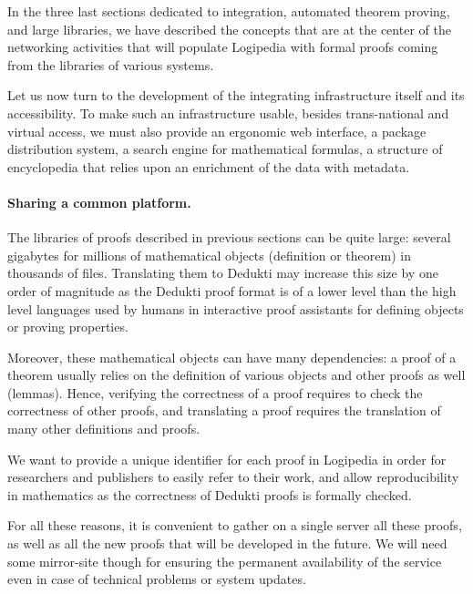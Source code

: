 
In the three last sections dedicated to integration, automated theorem
proving, and large libraries, we have described the concepts that are
at the center of the networking activities that will populate
Logipedia with formal proofs coming from the libraries of various
systems.

Let us now turn to the development of the integrating infrastructure
itself and its accessibility.
To make such an infrastructure
usable, besides trans-national and virtual access,
we must also provide an ergonomic web interface, a package
distribution system, a search engine for mathematical formulas, a
structure of encyclopedia
that relies upon an enrichment of the data with metadata.

\paragraph*{Sharing a common platform.}

The libraries of proofs described in previous sections can be quite
large: several gigabytes for millions of mathematical objects
(definition or theorem) in thousands of files. Translating them to
Dedukti may increase this size by one order of magnitude as the
Dedukti proof format is of a lower level than the high level languages
used by humans in interactive proof assistants for defining objects or
proving properties.

Moreover, these mathematical objects can have many dependencies: a
proof of a theorem usually relies on the definition of various objects
and other proofs as well (lemmas). Hence, verifying the correctness of
a proof requires to check the correctness of other proofs, and
translating a proof requires the translation of many other definitions
and proofs.

We want to provide a unique identifier for each proof in
Logipedia in order for researchers and publishers to easily refer to
their work, and allow reproducibility in mathematics as the
correctness of Dedukti proofs is formally checked.

For all these reasons, it is convenient to gather on a single server
all these proofs, as well as all the new proofs that will be developed
in the future. We will need some mirror-site though for ensuring the
permanent availability of the service even in case of technical
problems or system updates.


